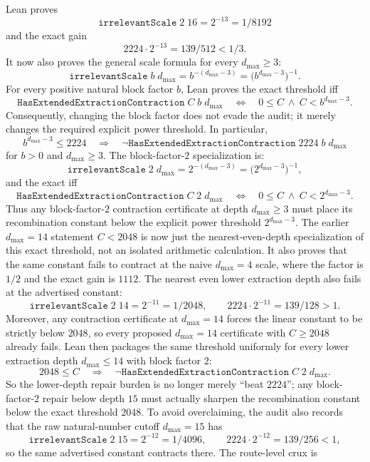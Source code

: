 \documentclass[11pt]{article}
\newcommand{\lean}[1]{\texttt{#1}}
\begin{document}
Lean proves
\[
  \lean{irrelevantScale}\;2\;16=2^{-13}=1/8192
\]
and the exact gain
\[
  2224\cdot 2^{-13}=139/512<1/3.
\]
It now also proves the general scale formula for every \(d_{\max}\ge 3\):
\[
  \lean{irrelevantScale}\;b\;d_{\max}=b^{-(d_{\max}-3)}
    =\bigl(b^{d_{\max}-3}\bigr)^{-1}.
\]
For every positive natural block factor \(b\), Lean proves the exact threshold
iff
\[
  \lean{HasExtendedExtractionContraction}\;C\;b\;d_{\max}
  \quad\Longleftrightarrow\quad
  0\le C\ \wedge\ C<b^{d_{\max}-3}.
\]
Consequently, changing the block factor does not evade the audit; it merely
changes the required explicit power threshold.  In particular,
\[
  b^{d_{\max}-3}\le 2224
  \quad\Longrightarrow\quad
  \neg\lean{HasExtendedExtractionContraction}\;2224\;b\;d_{\max}
\]
for \(b>0\) and \(d_{\max}\ge3\).  The block-factor-\(2\) specialization is:
\[
  \lean{irrelevantScale}\;2\;d_{\max}=2^{-(d_{\max}-3)}
    =\bigl(2^{d_{\max}-3}\bigr)^{-1},
\]
and the exact iff
\[
  \lean{HasExtendedExtractionContraction}\;C\;2\;d_{\max}
  \quad\Longleftrightarrow\quad
  0\le C\ \wedge\ C<2^{d_{\max}-3}.
\]
Thus any block-factor-\(2\) contraction certificate at depth
\(d_{\max}\ge 3\) must place its recombination constant below the explicit
power threshold \(2^{d_{\max}-3}\).  The earlier \(d_{\max}=14\) statement
\(C<2048\) is now just the nearest-even-depth specialization of this exact
threshold, not an isolated arithmetic calculation.
It also proves that the same constant fails to contract at the naive
\(d_{\max}=4\) scale, where the factor is \(1/2\) and the exact gain is
\(1112\).  The nearest even lower extraction depth also fails at the advertised
constant:
\[
  \lean{irrelevantScale}\;2\;14=2^{-11}=1/2048,\qquad
  2224\cdot 2^{-11}=139/128>1.
\]
Moreover, any contraction certificate at \(d_{\max}=14\) forces the linear
constant to be strictly below \(2048\), so every proposed \(d_{\max}=14\)
certificate with \(C\ge 2048\) already fails.  Lean then packages the same
threshold uniformly for every lower extraction depth \(d_{\max}\le 14\) with
block factor \(2\):
\[
  2048 \le C
  \quad\Longrightarrow\quad
  \neg \lean{HasExtendedExtractionContraction}\;C\;2\;d_{\max}.
\]
So the lower-depth repair burden is no longer merely ``beat \(2224\)''; any
block-factor-\(2\) repair below depth \(15\) must actually sharpen the
recombination constant below the exact threshold \(2048\).  To avoid
overclaiming, the audit also records that the raw natural-number cutoff
\(d_{\max}=15\) has
\[
  \lean{irrelevantScale}\;2\;15=2^{-12}=1/4096,\qquad
  2224\cdot 2^{-12}=139/256<1,
\]
so the same advertised constant contracts there.  The route-level crux is
\end{document}
